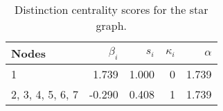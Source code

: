 \begin{table}
\centering
\caption{\label{tab:star}Distinction centrality scores for the star graph.}
\centering
\begin{tabular}[t]{lrrrr}
\toprule
Nodes & $\beta_i$ & $s_i$ & $\kappa_i$ & $\alpha$\\
\midrule
1 & 1.739 & 1.000 & 0 & 1.739\\
2, 3, 4, 5, 6, 7 & -0.290 & 0.408 & 1 & 1.739\\
\bottomrule
\end{tabular}
\end{table}
